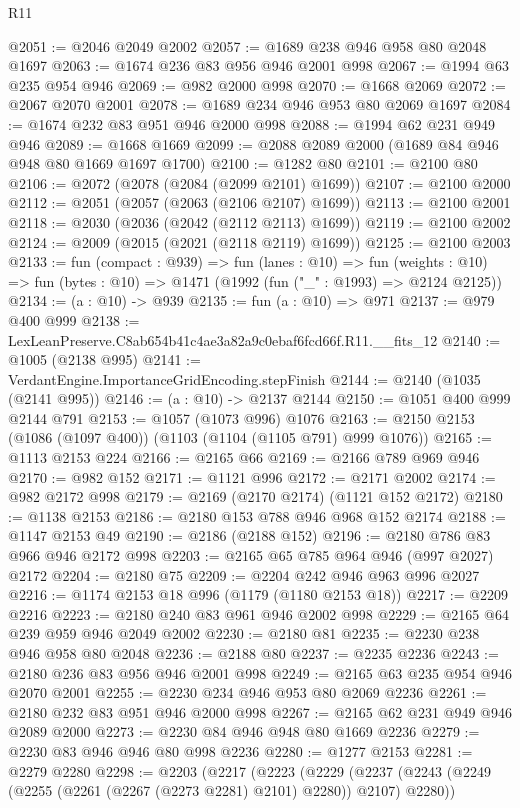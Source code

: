 \begin{lexlean}{R11}
\begin{coremodule}
@2051 := @2046 @2049 @2002
@2057 := @1689 @238 @946 @958 @80 @2048 @1697
@2063 := @1674 @236 @83 @956 @946 @2001 @998
@2067 := @1994 @63 @235 @954 @946
@2069 := @982 @2000 @998
@2070 := @1668 @2069
@2072 := @2067 @2070 @2001
@2078 := @1689 @234 @946 @953 @80 @2069 @1697
@2084 := @1674 @232 @83 @951 @946 @2000 @998
@2088 := @1994 @62 @231 @949 @946
@2089 := @1668 @1669
@2099 := @2088 @2089 @2000 (@1689 @84 @946 @948 @80 @1669 @1697 @1700)
@2100 := @1282 @80
@2101 := @2100 @80
@2106 := @2072 (@2078 (@2084 (@2099 @2101) @1699))
@2107 := @2100 @2000
@2112 := @2051 (@2057 (@2063 (@2106 @2107) @1699))
@2113 := @2100 @2001
@2118 := @2030 (@2036 (@2042 (@2112 @2113) @1699))
@2119 := @2100 @2002
@2124 := @2009 (@2015 (@2021 (@2118 @2119) @1699))
@2125 := @2100 @2003
@2133 := fun (compact : @939) =>
  fun (lanes : @10) =>
  fun (weights : @10) => fun (bytes : @10) => @1471 (@1992 (fun ("_" : @1993) => @2124 @2125))
@2134 := (a : @10) -> @939
@2135 := fun (a : @10) => @971
@2137 := @979 @400 @999
@2138 := LexLeanPreserve.C8ab654b41c4ae3a82a9c0ebaf6fcd66f.R11.__fits_12
@2140 := @1005 (@2138 @995)
@2141 := VerdantEngine.ImportanceGridEncoding.stepFinish
@2144 := @2140 (@1035 (@2141 @995))
@2146 := (a : @10) -> @2137 @2144
@2150 := @1051 @400 @999 @2144 @791
@2153 := @1057 (@1073 @996) @1076
@2163 := @2150 @2153 (@1086 (@1097 @400)) (@1103 (@1104 (@1105 @791) @999 @1076))
@2165 := @1113 @2153 @224
@2166 := @2165 @66
@2169 := @2166 @789 @969 @946
@2170 := @982 @152
@2171 := @1121 @996
@2172 := @2171 @2002
@2174 := @982 @2172 @998
@2179 := @2169 (@2170 @2174) (@1121 @152 @2172)
@2180 := @1138 @2153
@2186 := @2180 @153 @788 @946 @968 @152 @2174
@2188 := @1147 @2153 @49
@2190 := @2186 (@2188 @152)
@2196 := @2180 @786 @83 @966 @946 @2172 @998
@2203 := @2165 @65 @785 @964 @946 (@997 @2027) @2172
@2204 := @2180 @75
@2209 := @2204 @242 @946 @963 @996 @2027
@2216 := @1174 @2153 @18 @996 (@1179 (@1180 @2153 @18))
@2217 := @2209 @2216
@2223 := @2180 @240 @83 @961 @946 @2002 @998
@2229 := @2165 @64 @239 @959 @946 @2049 @2002
@2230 := @2180 @81
@2235 := @2230 @238 @946 @958 @80 @2048
@2236 := @2188 @80
@2237 := @2235 @2236
@2243 := @2180 @236 @83 @956 @946 @2001 @998
@2249 := @2165 @63 @235 @954 @946 @2070 @2001
@2255 := @2230 @234 @946 @953 @80 @2069 @2236
@2261 := @2180 @232 @83 @951 @946 @2000 @998
@2267 := @2165 @62 @231 @949 @946 @2089 @2000
@2273 := @2230 @84 @946 @948 @80 @1669 @2236
@2279 := @2230 @83 @946 @946 @80 @998 @2236
@2280 := @1277 @2153
@2281 := @2279 @2280
@2298 := @2203
    (@2217
      (@2223
        (@2229
          (@2237 (@2243 (@2249 (@2255 (@2261 (@2267 (@2273 @2281) @2101) @2280)) @2107) @2280))

\end{coremodule}
\end{lexlean}
